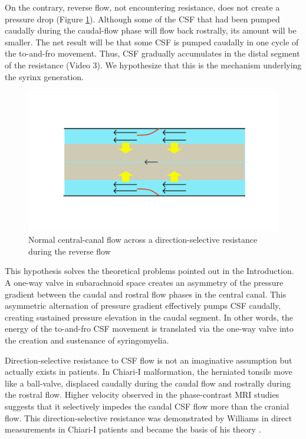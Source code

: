\documentclass[fleqn,10pt]{wlscirep}
\begin{document}
On the contrary, reverse flow, not encountering resistance, does not create
a pressure drop (Figure \ref{fig:pump_open}). Although some of the CSF that
had been pumped caudally during the caudal-flow phase will flow back
rostrally, its amount will be smaller. The net result will be that some CSF
is pumped caudally in one cycle of the to-and-fro movement. Thus, CSF
gradually accumulates in the distal segment of the resistance (Video 3). We
hypothesize that this is the mechanism underlying the syrinx generation.

\begin{figure}[hbt]
    \centering
    \includegraphics[width=\textwidth]{pumping_mechanism_open.jpg}
    \caption{Normal central-canal flow across a direction-selective
    resistance during the reverse flow}
    \label{fig:pump_open}
\end{figure}

This hypothesis solves the theoretical problems pointed out in the
Introduction. A one-way valve in subarachnoid space creates an asymmetry of
the pressure gradient between the caudal and rostral flow phases in the
central canal. This asymmetric alternation of pressure gradient effectively
pumps CSF caudally, creating sustained pressure elevation in the caudal
segment. In other words, the energy of the to-and-fro CSF movement is
translated via the one-way valve into the creation and sustenance of
syringomyelia.

Direction-selective resistance to CSF flow is not an imaginative assumption
but actually exists in patients. In Chiari-I malformation, the herniated
tonsils move like a ball-valve, displaced caudally during the caudal flow
and rostrally during the rostral flow. Higher velocity observed in the
phase-contrast MRI studies suggests that it selectively impedes the caudal
CSF flow more than the cranial flow. This direction-selective resistance
was demonstrated by Williams in direct measurements in Chiari-I patients
and became the basis of his theory \cite{williams1981simultaneous}.
\end{document}
